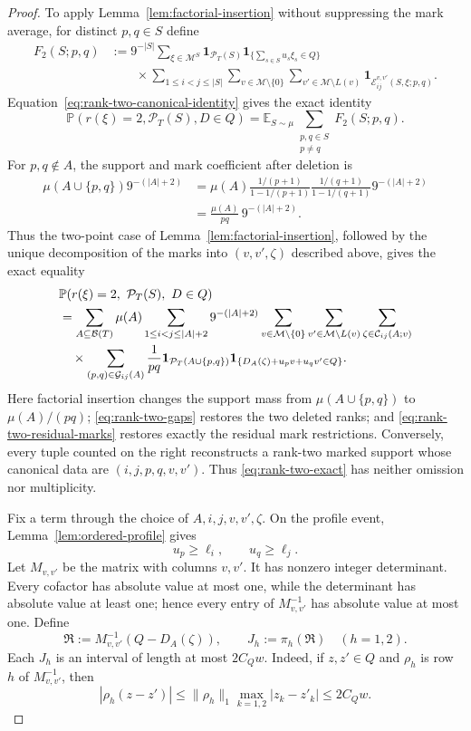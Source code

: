 \documentclass[11pt]{article}
\numberwithin{equation}{section}
\theoremstyle{plain}
\newcommand{\Pp}{\mathbb P}
\newcommand{\E}{\mathbb E}
\newcommand{\1}{\mathbf 1}
\newcommand{\cB}{\mathcal B}
\newcommand{\cM}{\mathcal M}
\begin{document}
\begin{proof}
To apply Lemma~\ref{lem:factorial-insertion} without suppressing the mark
average, for distinct $p,q\in S$ define
\begin{align*}
 F_2(S;p,q)
 &:=
 9^{-|S|}\sum_{\xi\in\cM^S}
 \1_{\mathcal P_T(S)}
 \1_{\{\sum_{s\in S}u_s\xi_s\in Q\}}\\
 &\qquad\times
 \sum_{1\le i<j\le |S|}
 \sum_{v\in\cM\setminus\{0\}}
 \sum_{v'\in\cM\setminus L(v)}
 \1_{\mathcal E_{ij}^{v,v'}(S,\xi;p,q)}.
\end{align*}
Equation~\eqref{eq:rank-two-canonical-identity} gives the exact identity
\[
 \Pp(r(\xi)=2,\mathcal P_T(S),D\in Q)
 =
 \E_{S\sim\mu}\sum_{\substack{p,q\in S\\p\ne q}}F_2(S;p,q).
\]
For $p,q\notin A$, the support and mark coefficient after deletion is
\begin{align*}
 \mu(A\cup\{p,q\})9^{-(|A|+2)}
 &=\mu(A)
 \frac{1/(p+1)}{1-1/(p+1)}
 \frac{1/(q+1)}{1-1/(q+1)}
 9^{-(|A|+2)}\\
 &=\frac{\mu(A)}{pq}\,9^{-(|A|+2)}.
\end{align*}
Thus the two-point case of
Lemma~\ref{lem:factorial-insertion}, followed by the unique decomposition
of the marks into $(v,v',\zeta)$ described above, gives the exact equality
\begin{align}
 &\Pp(r(\xi)=2,\ \mathcal P_T(S),\ D\in Q)\notag\\
 &=\sum_{A\subseteq\cB(T)}\mu(A)
   \sum_{1\le i<j\le |A|+2}9^{-(|A|+2)}
   \sum_{v\in\cM\setminus\{0\}}
   \sum_{v'\in\cM\setminus L(v)}
   \sum_{\zeta\in\mathcal C_{ij}(A;v)}\notag\\
 &\quad\times
   \sum_{(p,q)\in\mathcal G_{ij}(A)}\frac1{pq}
   \1_{\mathcal P_T(A\cup\{p,q\})}
   \1_{\{D_A(\zeta)+u_pv+u_qv'\in Q\}}.
                                                        \label{eq:rank-two-exact}
\end{align}
Here factorial insertion changes the support mass from
$\mu(A\cup\{p,q\})$ to $\mu(A)/(pq)$;
\eqref{eq:rank-two-gaps} restores the two deleted ranks; and
\eqref{eq:rank-two-residual-marks} restores exactly the residual mark
restrictions.  Conversely, every tuple counted on the right reconstructs
a rank-two marked support whose canonical data are
$(i,j,p,q,v,v')$.  Thus \eqref{eq:rank-two-exact} has neither omission nor
multiplicity.

Fix a term through the choice of $A,i,j,v,v',\zeta$.  On the profile
event, Lemma~\ref{lem:ordered-profile} gives
\begin{equation}\label{eq:pivot-lower-weights}
 u_p\ge\ell_i,\qquad u_q\ge\ell_j.
\end{equation}
Let $M_{v,v'}$ be the matrix with columns $v,v'$.  It has nonzero integer
determinant.  Every cofactor has absolute value at most one, while the
determinant has absolute value at least one; hence every entry of
$M_{v,v'}^{-1}$ has absolute value at most one.  Define
\[
 \mathfrak R:=M_{v,v'}^{-1}(Q-D_A(\zeta)),
 \qquad J_h:=\pi_h(\mathfrak R)\quad(h=1,2).
\]
Each $J_h$ is an interval of length at most $2C_Qw$.  Indeed, if
$z,z'\in Q$ and $\rho_h$ is row $h$ of $M_{v,v'}^{-1}$, then
\[
 |\rho_h(z-z')|
 \le\|\rho_h\|_1\max_{k=1,2}|z_k-z'_k|
 \le2C_Qw.
\]


\end{proof}
\end{document}
